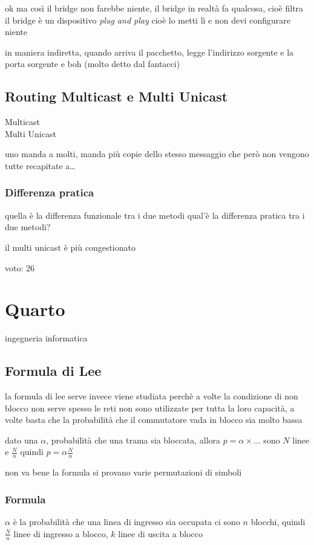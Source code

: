 \documentclass[11pt]{article}
\begin{document}
ok ma così il bridge non farebbe niente, il bridge in realtà fa qualcosa, cioè filtra
il bridge è un dispositivo \emph{plug and play} cioè lo metti lì e non devi configurare niente

in maniera indiretta, quando arriva il pacchetto, legge l'indirizzo sorgente e la porta sorgente e boh
(molto detto dal fantacci)

\subsection{Routing Multicast e Multi Unicast}
\label{sec:org0fb676c}
\begin{description}
\item[{Multicast}] 

\item[{Multi Unicast}] 
\end{description}
uno manda a molti, manda più copie dello stesso messaggio che però non vengono tutte recapitate a\ldots{}

\subsubsection{Differenza pratica}
\label{sec:org4d23bd4}
quella è la differenza funzionale tra i due metodi
qual'è la differenza pratica tra i due metodi?

il multi unicast è più congestionato

voto: 26

\section{Quarto}
\label{sec:org2df47d9}
ingegneria informatica
\subsection{Formula di Lee}
\label{sec:org22094d0}
la formula di lee serve invece
viene studiata perchè a volte la condizione di non blocco non serve
spesso le reti non sono utilizzate per tutta la loro capacità, a volte basta che la probabilità che il commutatore vada in blocco sia molto bassa

dato una \(\alpha\), probabilità che una trama sia bloccata, allora \(p = \alpha \times \dots\) 
sono \(N\) linee e \(\frac{N}{n}\) quindi \(p = \alpha \frac{N}{n}\)

non va bene la formula
si provano varie permutazioni di simboli

\subsubsection{Formula}
\label{sec:orgf28db30}
\(\alpha\) è la probabilità che una linea di ingresso sia occupata
ci sono \(n\) blocchi, quindi \(\frac{N}{n}\) linee di ingresso a blocco, \(k\) linee di uscita a blocco
\end{document}
